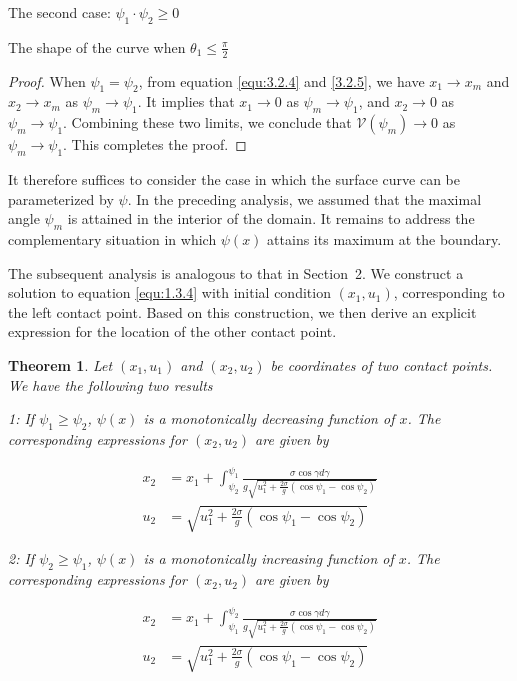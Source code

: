 \documentclass[letterpaper,reqno,10pt,twoside]{amsart}
\newtheorem{theorem}{Theorem}[section]
\theoremstyle{definition}
\theoremstyle{remark}
\begin{document}
\begin{section}{The second case: $\psi_1\cdot \psi_2\geq 0$ }
\begin{subsection}{The shape of the curve when $\theta_1\leq \frac{\pi}{2}$}
\begin{proof}
        When $\psi_{1}=\psi_{2}$, from equation \eqref{equ:3.2.4} and \eqref{3.2.5}, we have $x_{1}\rightarrow x_{m}$ and $x_{2}\rightarrow x_{m}$ as $\psi_{m}\rightarrow \psi_{1}$. It implies that $x_{1}\rightarrow 0$ as $\psi_{m}\rightarrow \psi_{1}$, and $x_{2}\rightarrow 0$ as $\psi_{m}\rightarrow \psi_{1}$. Combining these two limits, we conclude that $\mathscr{V}(\psi_{m})\rightarrow 0$ as $\psi_{m}\rightarrow \psi_{1}$. This completes the proof.
        \end{proof}

       It therefore suffices to consider the case in which the surface curve can be parameterized by $\psi$. In the preceding analysis, we assumed that the maximal angle $\psi_m$ is attained in the interior of the domain. It remains to address the complementary situation in which $\psi(x)$ attains its maximum at the boundary.

       The subsequent analysis is analogous to that in Section~2. We construct a solution to equation \eqref{equ:1.3.4} with initial condition $(x_1,u_1)$, corresponding to the left contact point. Based on this construction, we then derive an explicit expression for the location of the other contact point.

        \begin{theorem}

         Let $(x_1,u_1)$ and $(x_2,u_2)$ be coordinates of two contact points. We have the following two results
        
        1: If $\psi_1\geq \psi_2$, $\psi(x)$ is a monotonically decreasing function of $x$. The corresponding expressions for $(x_{2},u_{2})$ are given by

        \begin{align}
             x_2&=x_1+\int_{\psi_2}^{\psi_1}\frac{\sigma\cos\gamma d\gamma}{g\sqrt{u_1^{2}+\frac{2\sigma}{g}(\cos\psi_1-\cos\psi_2)}}\label{equ:3.2.15}\\
             u_2&=\sqrt{u_1^{2}+\frac{2\sigma}{g}(\cos\psi_1-\cos\psi_2)}\label{equ:3.2.16}
        \end{align}

        2: If $\psi_2\geq \psi_1$, $\psi(x)$ is a monotonically increasing function of $x$. The corresponding expressions for $(x_{2},u_{2})$ are given by

        \begin{align}
            x_2&=x_1+\int_{\psi_1}^{\psi_2}\frac{\sigma\cos\gamma d\gamma}{g\sqrt{u_1^{2}+\frac{2\sigma}{g}(\cos\psi_1-\cos\psi_2)}} \label{equ:3.2.17}\\
            u_2&=\sqrt{u_1^{2}+\frac{2\sigma}{g}(\cos\psi_1-\cos\psi_2)}\label{equ:3.2.18}
        \end{align}
        

\end{theorem}
\end{subsection}
\end{section}
\end{document}
